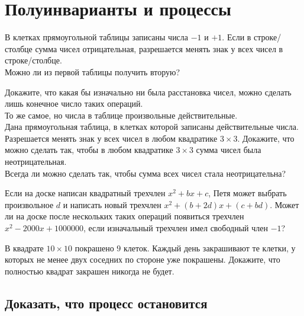 

\section*{Полуинварианты и процессы}


\begin{problems}

\item
В клетках прямоугольной таблицы записаны числа $-1$ и $+1$.
Если в строке/столбце сумма чисел отрицательная, разрешается менять знак у всех
чисел в строке/столбце.
\\
\sbp
Можно ли из первой таблицы получить вторую?
\begin{center}
\quad
{}
\end{center}
\sbp
Докажите, что какая бы изначально ни была расстановка чисел, можно сделать лишь
конечное число таких операций.
\\
\sbp
То же самое, но числа в таблице произвольные действительные.
\\
\sbp
Дана прямоугольная таблица, в клетках которой записаны действительные числа.
Разрешается менять знак у всех чисел в любом квадратике $3 \times 3$.
Докажите, что можно сделать так, чтобы в любом квадратике $3 \times 3$ сумма
чисел была неотрицательная.
\\
\sbp
Всегда ли можно сделать так, чтобы сумма всех чисел стала неотрицательна?

\item
Если на доске написан квадратный трехчлен $x^2 + bx + c$, Петя может выбрать
произвольное $d$ и написать новый трехчлен  $x^2 + (b + 2 d) x + (c + b d)$.
Может ли на доске после нескольких таких операций появиться трехчлен
$x^2 - 2000 x + 1000000$, если изначальный трехчлен имел свободный член $-1$?

\item
В квадрате $10 \times 10$ покрашено $9$ клеток.
Каждый день закрашивают те клетки, у которых не менее двух соседних по стороне
уже покрашены.
Докажите, что полностью квадрат закрашен никогда не будет.


\subsection*{Доказать, что процесс остановится}


\end{problems}
